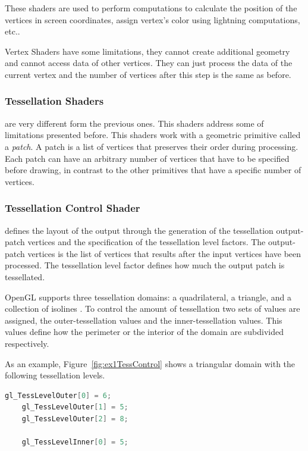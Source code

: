 These shaders are used to perform computations to calculate the position of the vertices in screen coordinates, assign vertex's color using lightning computations, etc..

Vertex Shaders have some limitations, they cannot create additional geometry and cannot access data of other vertices. They can just process the data of the current vertex and the number of vertices after this step is the same as before.


\subsubsection{Tessellation Shaders} %
\label{sub:tesselation_shaders}
are very different form the previous ones. This shaders address some of limitations presented before.
This shaders work with a geometric primitive called a \emph{patch}. A patch is a list of vertices that preserves their order during processing. Each patch can have an arbitrary number of vertices that have to be specified before drawing, in contrast to the other primitives that have a specific number of vertices.

\subsubsection{Tessellation Control Shader} %
\label{ssub:tesselation_control_shader}
	 defines the layout of the output through the generation of the tessellation output-patch vertices and the specification of the tessellation level factors. The output-patch vertices is the list of vertices that results after the input vertices have been processed. The tessellation level factor defines how much the output patch is tessellated. 

	OpenGL supports three tessellation domains: a quadrilateral, a triangle, and a collection of isolines \cite{shreiner2013opengl}. To control the amount of tessellation two sets of values are assigned, the outer-tessellation values and the inner-tessellation values. This values define how the perimeter or the interior of the domain are subdivided respectively. 

	As an example, Figure~\ref{fig:ex1TessControl} shows a triangular domain with the following tessellation levels. 
	\begin{lstlisting}[frame=single,language=C++]
	gl_TessLevelOuter[0] = 6;
	gl_TessLevelOuter[1] = 5;
	gl_TessLevelOuter[2] = 8;

	gl_TessLevelInner[0] = 5;
	\end{lstlisting}

